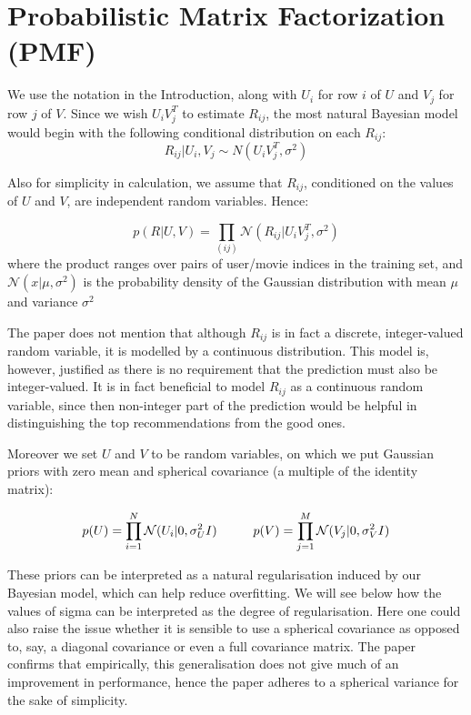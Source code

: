\documentclass{article}
\theoremstyle{plain}
\begin{document}
\section{Probabilistic Matrix Factorization (PMF)}

We use the notation in the Introduction, along with $U_i$ for row $i$ of $U$ and $V_j$ for row $j$ of $V$. Since we wish $U_i V_j^T$ to estimate $R_{ij}$, the most natural Bayesian model would begin with the following conditional distribution on each $R_{ij}$:
\begin{equation}
R_{ij}|{U_i},{V_j} \sim N(U_i V_j^T,\sigma^2)
\end{equation}

Also for simplicity in calculation, we assume that $R_{ij}$, conditioned on the values of $U$ and $V$, are independent random variables. Hence:

\begin{equation}
p(R|U,V)=\prod_{(ij)}\mathcal{N}(R_{ij}|U_i V_j^T,\sigma^2)
\end{equation}
where the product ranges over pairs of user/movie indices in the training set, and $\mathcal{N}(x|\mu,\sigma^2)$ is the probability density of the Gaussian distribution with mean $\mu$ and variance $\sigma^2$

The paper does not mention that although $R_{ij}$ is in fact a discrete, integer-valued random variable, it is modelled by a continuous distribution. This model is, however, justified as there is no requirement that the prediction must also be integer-valued. It is in fact beneficial to model $R_{ij}$ as a continuous random variable, since then non-integer part of the prediction would be helpful in distinguishing the top recommendations from the good ones.

Moreover we set $U$ and $V$ to be random variables, on which we put Gaussian priors with zero mean and spherical covariance (a multiple of the identity matrix):

\begin{equation}
p(U)=\prod_{i=1}^N \mathcal{N}(U_i|0,\sigma_U^2I) \hspace{10 mm} p(V)=\prod_{j=1}^M \mathcal{N}(V_j|0,\sigma_V^2I)
\end{equation}

These priors can be interpreted as a natural regularisation induced by our Bayesian model, which can help reduce overfitting. We will see below how the values of sigma can be interpreted as the degree of regularisation. Here one could also raise the issue whether it is sensible to use a spherical covariance as opposed to, say, a diagonal covariance or even a full covariance matrix. The paper confirms that empirically, this generalisation does not give much of an improvement in performance, hence the paper adheres to a spherical variance for the sake of simplicity. 
\end{document}

